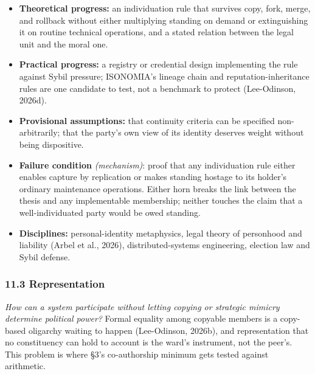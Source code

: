\documentclass[
  11pt,
  letterpaper,
]{article}
\providecommand{\tightlist}{%
  \setlength{\itemsep}{0pt}\setlength{\parskip}{0pt}}
\begin{document}
\begin{itemize}
\tightlist
\item
  \textbf{Theoretical progress:} an individuation rule that survives
  copy, fork, merge, and rollback without either multiplying standing on
  demand or extinguishing it on routine technical operations, and a
  stated relation between the legal unit and the moral one.
\item
  \textbf{Practical progress:} a registry or credential design
  implementing the rule against Sybil pressure; ISONOMIA's lineage chain
  and reputation-inheritance rules are one candidate to test, not a
  benchmark to protect (Lee-Odinson, 2026d).
\item
  \textbf{Provisional assumptions:} that continuity criteria can be
  specified non-arbitrarily; that the party's own view of its identity
  deserves weight without being dispositive.
\item
  \textbf{Failure condition} \emph{(mechanism)}: proof that any
  individuation rule either enables capture by replication or makes
  standing hostage to its holder's ordinary maintenance operations.
  Either horn breaks the link between the thesis and any implementable
  membership; neither touches the claim that a well-individuated party
  would be owed standing.
\item
  \textbf{Disciplines:} personal-identity metaphysics, legal theory of
  personhood and liability (Arbel et al., 2026), distributed-systems
  engineering, election law and Sybil defense.
\end{itemize}

\hypertarget{representation}{%
\subsubsection{11.3 Representation}\label{representation}}

\emph{How can a system participate without letting copying or strategic
mimicry determine political power?} Formal equality among copyable
members is a copy-based oligarchy waiting to happen (Lee-Odinson,
2026b), and representation that no constituency can hold to account is
the ward's instrument, not the peer's. This problem is where §3's
co-authorship minimum gets tested against arithmetic.
\end{document}
